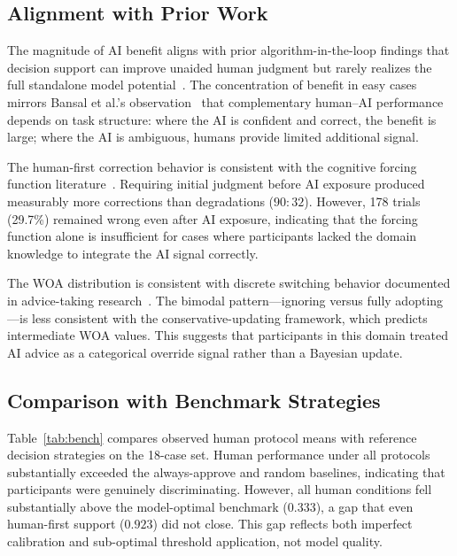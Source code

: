 \documentclass[conference]{IEEEtran}
\begin{document}
\subsection{Alignment with Prior Work}

The magnitude of AI benefit aligns with prior algorithm-in-the-loop
findings that decision support can improve unaided human judgment but
rarely realizes the full standalone model potential~\cite{green2019principles,bansal2021does}.
The concentration of benefit in easy cases mirrors Bansal et al.'s
observation~\cite{bansal2021does} that complementary human--AI performance
depends on task structure: where the AI is confident and correct, the
benefit is large; where the AI is ambiguous, humans provide limited
additional signal.

The human-first correction behavior is consistent with the cognitive
forcing function literature~\cite{bucinca2021trust}. Requiring initial
judgment before AI exposure produced measurably more corrections than
degradations ($90:32$). However, 178 trials (29.7\%) remained wrong even
after AI exposure, indicating that the forcing function alone is
insufficient for cases where participants lacked the domain knowledge to
integrate the AI signal correctly.

The WOA distribution is consistent with discrete switching behavior
documented in advice-taking research~\cite{bonaccio2006advice,harvey1997taking}. The bimodal pattern---ignoring versus fully
adopting---is less consistent with the conservative-updating framework,
which predicts intermediate WOA values. This suggests that participants
in this domain treated AI advice as a categorical override signal rather
than a Bayesian update.

\subsection{Comparison with Benchmark Strategies}

Table~\ref{tab:bench} compares observed human protocol means with
reference decision strategies on the 18-case set. Human performance under
all protocols substantially exceeded the always-approve and random
baselines, indicating that participants were genuinely discriminating.
However, all human conditions fell substantially above the model-optimal
benchmark (0.333), a gap that even human-first support ($0.923$) did not
close. This gap reflects both imperfect calibration and sub-optimal
threshold application, not model quality.
\end{document}
